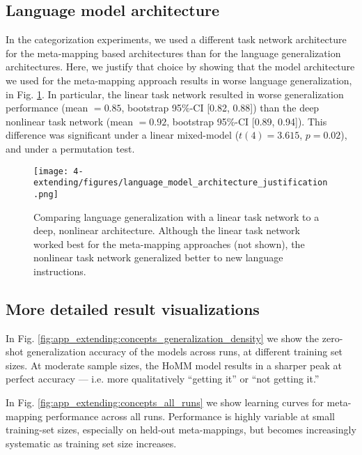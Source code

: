\subsection{Language model architecture} \label{app:extending_categorization_lang_arch}

In the categorization experiments, we used a different task network architecture for the meta-mapping based architectures than for the language generalization architectures. Here, we justify that choice by showing that the model architecture we used for the meta-mapping approach results in worse language generalization, in Fig. \ref{fig:app_extending_cat_lang_arch}. In particular, the linear task network resulted in worse generalization performance (mean \(= 0.85\), bootstrap 95\%-CI [0.82, 0.88]) than the deep nonlinear task network (mean \(= 0.92\), bootstrap 95\%-CI [0.89, 0.94]). This difference was significant under a linear mixed-model (\(t(4) = 3.615\), \(p = 0.02\)), and under a permutation test. \par 

\begin{figure}
\texttt{[image: 4-extending/figures/language\_model\_architecture\_justification.png]}
\caption[Comparing language generalization with linear vs. deep-nonlinear task-networks.]{Comparing language generalization with a linear task network to a deep, nonlinear architecture. Although the linear task network worked best for the meta-mapping approaches (not shown), the nonlinear task network generalized better to new language instructions.} \label{fig:app_extending_cat_lang_arch}
\end{figure}

\subsection{More detailed result visualizations}
In Fig. \ref{fig:app_extending:concepts_generalization_density} we show the zero-shot generalization accuracy of the models across runs, at different training set sizes. At moderate sample sizes, the HoMM model results in a sharper peak at perfect accuracy --- i.e. more qualitatively ``getting it'' or ``not getting it.'' \par 
In Fig. \ref{fig:app_extending:concepts_all_runs} we show learning curves for meta-mapping performance across all runs. Performance is highly variable at small training-set sizes, especially on held-out meta-mappings, but becomes increasingly systematic as training set size increases.\par

